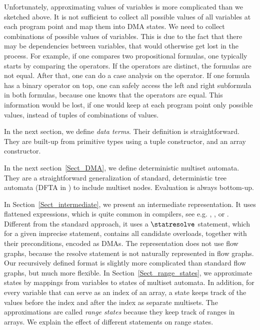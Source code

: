 Unfortunately, approximating values of variables is more
complicated than we sketched above. It is not sufficient
to collect all possible values of all variables at each program point
and map them into DMA states.
We need to collect combinations of possible values of variables. 
This is due to the fact that there may be dependencies between variables,
that would otherwise get lost in the process.
For example, if one compares two propositional formulas, one
typically starts by comparing the operators. If the operators are distinct,
the formulas are not equal. After that, one can do a case analysis
on the operator. If one formula has a binary operator on top,
one can safely access the left and right subformula in both formulas,
because one knows that the operators are equal. 
This information would be lost, if one would keep at each
program point only possible
values, instead of tuples of combinations of values.

In the next section, we define \emph{data terms}. 
Their definition is straightforward. They are built-up
from primitive types using a tuple constructor, and an array constructor. 

In the next section~\ref{Sect_DMA}, we define
deterministic multiset automata. 
They are a straightforward generalization of standard,
deterministic tree automata (DFTA in \cite{TATA2007})
to include multiset nodes. Evaluation is always bottom-up. 

In Section~\ref{Sect_intermediate}, we present an intermediate
representation. It uses flattened expressions, which
is quite common in compilers, see e.g.
\cite{LLVM2004}, \cite{Muchnick_CDI_1997}, or \cite{WiSe2023}.
Different from the standard approach, it uses a 
$ \statresolve $ statement, which for a given imprecise
statement, contains all candidate overloads, together with 
their preconditions, encoded as DMAs. 
The representation does not use flow graphs,
because the resolve statement is not naturally represented in
flow graphs. Our recursively defined format is slightly more
complicated than standard flow graphs, but much more flexible.
In Section~\ref{Sect_range_states}, we approximate states by 
mappings from variables to states of multiset automata. 
In addition, for every variable that can serve as an index of an array, 
a state keeps track of the values before the index and after the index
as separate multisets. The approximations are called 
\emph{range states} because they keep track of ranges in
arrays. We explain the effect of different statements
on range states. 

